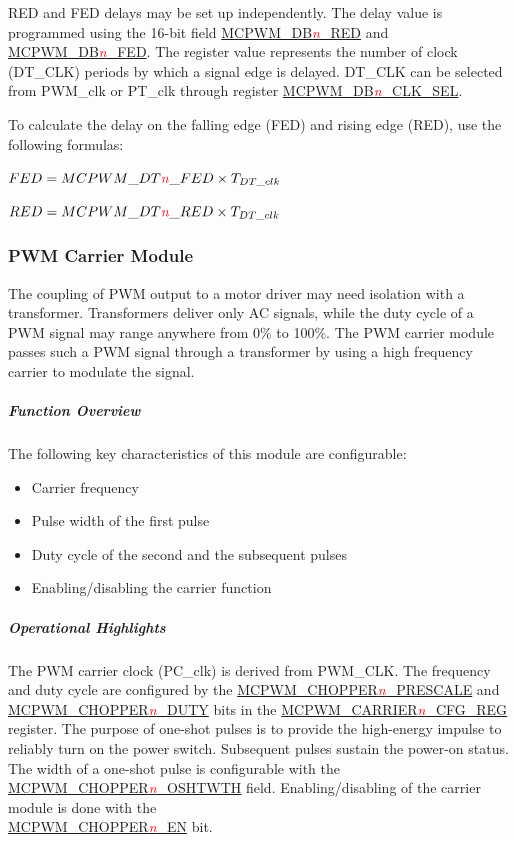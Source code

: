 \documentclass[main\_\_EN.tex]{subfiles}
\begin{document}
RED and FED delays may be set up independently. The delay value is programmed using the 16-bit field \hyperref[fielddesc:MCPWMDBNRED]{MCPWM\_DB\textcolor{red}{\it{n}}\_RED} and \hyperref[fielddesc:MCPWMDBNFED]{MCPWM\_DB\textcolor{red}{\it{n}}\_FED}. The register value represents the number of clock (DT\_CLK) periods by which a signal edge is delayed. DT\_CLK can be selected from PWM\_clk or PT\_clk through register \hyperref[fielddesc:MCPWMDBNCLKSEL]{MCPWM\_DB\textcolor{red}{\it{n}}\_CLK\_SEL}.

To calculate the delay on the falling edge (FED) and rising edge (RED), use the following formulas:
\begin{center}
    \item $FED = MCPWM\_DT\textcolor{red}{\it{n}}\_FED \times T_{DT\_clk}$
    \item $RED = MCPWM\_DT\textcolor{red}{\it{n}}\_RED \times T_{DT\_clk}$
\end{center}

\newpage

\subsubsection{PWM Carrier Module}
The coupling of PWM output to a motor driver may need isolation with a transformer. Transformers deliver only AC signals, while the duty cycle of a PWM signal may range anywhere from 0\% to 100\%. The PWM carrier module passes such a PWM signal through a transformer by using a high frequency carrier to modulate the signal.

\subparagraph{Function Overview}
The following key characteristics of this module are configurable:
\begin{itemize}
    \item Carrier frequency
    \item Pulse width of the first pulse
    \item Duty cycle of the second and the subsequent pulses
    \item Enabling/disabling the carrier function
\end{itemize}

\subparagraph{Operational Highlights}
The PWM carrier clock (PC\_clk) is derived from PWM\_CLK. The frequency and duty cycle are configured by the \hyperref[fielddesc:MCPWMCHOPPERNPRESCALE]{MCPWM\_CHOPPER\textcolor{red}{\it{n}}\_PRESCALE} and \hyperref[fielddesc:MCPWMCHOPPERNDUTY]{MCPWM\_CHOPPER\textcolor{red}{\it{n}}\_DUTY} bits in the \hyperref[regdesc:MCPWMCARRIERNCFGREG]{MCPWM\_CARRIER\textcolor{red}{\it{n}}\_CFG\_REG} register. The purpose of one-shot pulses is to provide the high-energy impulse to reliably turn on the power switch. Subsequent pulses sustain the power-on status. The width of a one-shot pulse is configurable with the\\ \hyperref[fielddesc:MCPWMCHOPPERNOSHTWTH]{MCPWM\_CHOPPER\textcolor{red}{\it{n}}\_OSHTWTH} field. Enabling/disabling of the carrier module is done with the\\ \hyperref[fielddesc:MCPWMCHOPPERNEN]{MCPWM\_CHOPPER\textcolor{red}{\it{n}}\_EN} bit.
\end{document}
